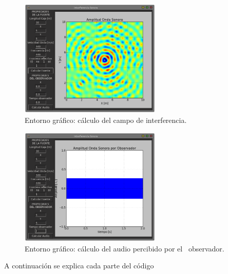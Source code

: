 \begin{figure}[htbp]
	\centering
	\includegraphics[width=0.60\textwidth]
	{./pictures/environment_field.png}

	\caption{\small{Entorno gráfico: cálculo del campo de interferencia.}}
	
	\label{fig:env_field}
\end{figure}

\begin{figure}[htbp]
	\centering
	\includegraphics[width=0.60\textwidth]
	{./pictures/environment_sound.png}

	\caption{\small{Entorno gráfico: cálculo del audio percibido por el \
	observador.}}
	
	\label{fig:env_soun}
\end{figure}


A continuación se explica cada parte del código


